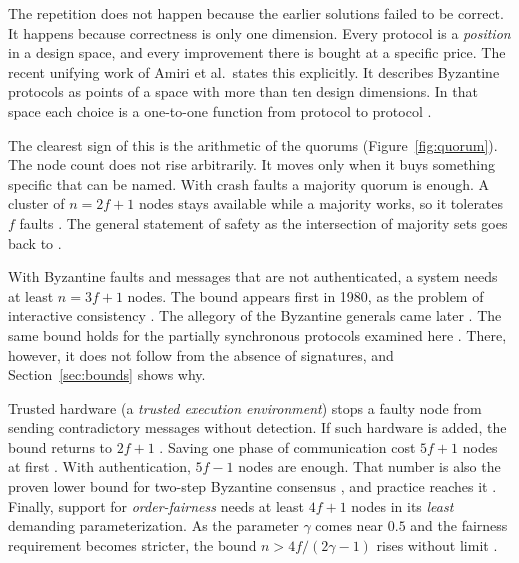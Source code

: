 The repetition does not happen because the earlier solutions failed to be
correct. It happens because correctness is only one dimension. Every
protocol is a \emph{position} in a design space, and every improvement
there is bought at a specific price. The recent unifying work of Amiri
et al.\ states this explicitly. It describes Byzantine protocols as
points of a space with more than ten design dimensions. In that space
each choice is a one-to-one function from protocol to protocol
\cite{amiri2024bedrock}.

The clearest sign of this is the arithmetic of the quorums
(Figure~\ref{fig:quorum}). The node count does not rise arbitrarily. It
moves only when it buys something specific that can be named. With crash
faults a majority quorum is enough. A cluster of $n = 2f+1$ nodes stays
available while a majority works, so it tolerates $f$ faults
\cite{ongaro2014raft}. The general statement of safety as the
intersection of majority sets goes back to \cite{lamport1998parttime}.

With Byzantine faults and messages that are not authenticated, a system
needs at least $n = 3f+1$ nodes. The bound appears first in 1980, as the
problem of interactive consistency \cite{pease1980reaching}. The allegory
of the Byzantine generals came later \cite{lamport1982byzantine}. The
same bound holds for the partially synchronous protocols examined here
\cite{dwork1988consensus,amiri2024bedrock}. There, however, it does not
follow from the absence of signatures, and Section~\ref{sec:bounds} shows
why.

Trusted hardware (a \emph{trusted execution environment}) stops a faulty
node from sending contradictory messages without detection. If such
hardware is added, the bound returns to $2f+1$ \cite{amiri2024bedrock}.
Saving one phase of communication cost $5f+1$ nodes at first
\cite{martin2006fab}\unver. With authentication, $5f-1$ nodes are enough. That
number is also the proven lower bound for two-step Byzantine consensus
\cite{kuznetsov2021optimal}\unver, and practice reaches it
\cite{amiri2024bedrock}. Finally, support for \emph{order-fairness} needs
at least $4f+1$ nodes in its \emph{least} demanding parameterization. As
the parameter $\gamma$ comes near $0.5$ and the fairness requirement
becomes stricter, the bound $n > 4f/(2\gamma-1)$ rises without limit
\cite{kelkar2020orderfairness,amiri2024bedrock}\unver.

